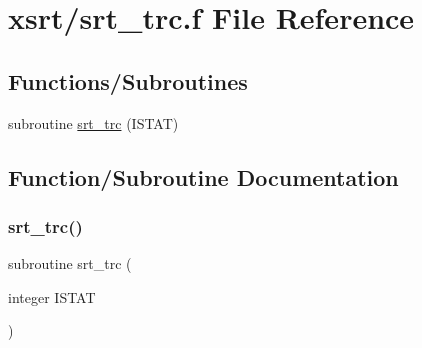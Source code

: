 \hypertarget{srt__trc_8f}{}\section{xsrt/srt\+\_\+trc.f File Reference}
\label{srt__trc_8f}
\subsection*{Functions/\+Subroutines}
\begin{DoxyCompactItemize}
\item 
subroutine \hyperlink{srt__trc_8f_aab9f8cf08809a839ccdd1b2e2f1fca5b}{srt\+\_\+trc} (I\+S\+T\+AT)
\end{DoxyCompactItemize}


\subsection{Function/\+Subroutine Documentation}
\mbox{\label{srt__trc_8f_aab9f8cf08809a839ccdd1b2e2f1fca5b}} 
\subsubsection{\texorpdfstring{srt\+\_\+trc()}{srt\_trc()}}
{\footnotesize\ttfamily subroutine srt\+\_\+trc (\begin{DoxyParamCaption}\item[{integer}]{I\+S\+T\+AT }\end{DoxyParamCaption})}

